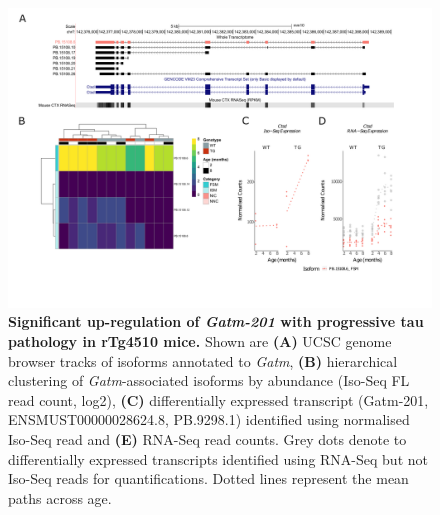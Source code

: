 \begin{landscape}
	\begin{figure}[!htp]
		\centering
		\includegraphics[page=3,trim={1.5cm 3.5cm 2cm 1cm}, scale = 0.85]{Figures/Ch5_DiffPlots_Landscape.pdf}
		\captionsetup{width=1.5\textwidth}
		\caption[Differential \textit{Gatm} transcript expression]%
		{\textbf{Significant up-regulation of \textit{Gatm-201} with progressive tau pathology in rTg4510 mice.} Shown are \textbf{(A)} UCSC genome browser tracks of isoforms annotated to \textit{Gatm}, \textbf{(B)} hierarchical clustering of \textit{Gatm}-associated isoforms by abundance (Iso-Seq FL read count, log2), \textbf{(C)} differentially expressed transcript (Gatm-201, ENSMUST00000028624.8, PB.9298.1) identified using normalised Iso-Seq read and \textbf{(E)} RNA-Seq read counts. Grey dots denote to differentially expressed transcripts identified using RNA-Seq but not Iso-Seq reads for quantifications. Dotted lines represent the mean paths across age.}   
		\label{fig:Gatm}
	\end{figure}	
\end{landscape}

